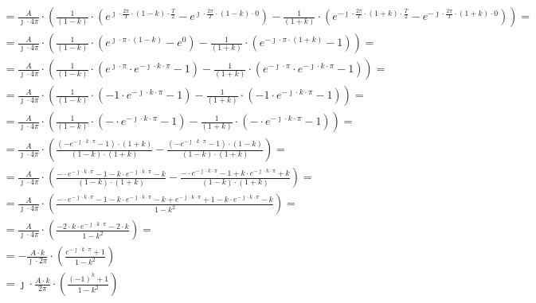 \begin{task}
\begin{align*}
&=\frac{A}{\jmath \cdot 4\pi} \cdot \left( \frac{1}{\left(1 -k\right)} \cdot \left(e^{\jmath \cdot \frac{2\pi}{T} \cdot \left(1 -k\right) \cdot \frac{T}{2}} -e^{\jmath \cdot \frac{2\pi}{T} \cdot \left(1 -k\right) \cdot 0}\right) - \frac{1}{ \left(1+k\right)}\cdot \left( e^{-\jmath \cdot \frac{2\pi}{T} \cdot \left(1+k\right)\cdot \frac{T}{2} } - e^{-\jmath \cdot \frac{2\pi}{T} \cdot \left(1+k\right)\cdot 0 }\right) \right)=\\
&=\frac{A}{\jmath \cdot 4\pi} \cdot \left( \frac{1}{\left(1 -k\right)} \cdot \left(e^{\jmath \cdot \pi \cdot \left(1 -k\right) } -e^{0}\right) - \frac{1}{ \left(1+k\right)}\cdot \left( e^{-\jmath \cdot \pi \cdot \left(1+k\right) } - 1\right) \right)=\\
&=\frac{A}{\jmath \cdot 4\pi} \cdot \left( \frac{1}{\left(1 -k\right)} \cdot \left(e^{\jmath \cdot \pi } \cdot e^{-\jmath \cdot k \cdot \pi}  -1\right) - \frac{1}{ \left(1+k\right)}\cdot \left( e^{-\jmath \cdot \pi } \cdot e^{-\jmath \cdot k \cdot \pi } - 1\right) \right)=\\
&=\frac{A}{\jmath \cdot 4\pi} \cdot \left( \frac{1}{\left(1 -k\right)} \cdot \left(-1 \cdot e^{-\jmath \cdot k \cdot \pi}  -1\right) - \frac{1}{ \left(1+k\right)}\cdot \left( -1 \cdot e^{-\jmath \cdot k \cdot \pi } - 1\right) \right)=\\
&=\frac{A}{\jmath \cdot 4\pi} \cdot \left( \frac{1}{\left(1 -k\right)} \cdot \left(- \cdot e^{-\jmath \cdot k \cdot \pi}  -1\right) - \frac{1}{ \left(1+k\right)}\cdot \left( - \cdot e^{-\jmath \cdot k \cdot \pi } - 1\right) \right)=\\
&=\frac{A}{\jmath \cdot 4\pi} \cdot \left( \frac{\left(- e^{-\jmath \cdot k \cdot \pi}  -1\right) \cdot \left(1+k\right) }{\left(1 -k\right) \cdot \left(1+k\right)} - \frac{\left( - e^{-\jmath \cdot k \cdot \pi } - 1\right)  \cdot \left(1 -k\right)}{\left(1 -k\right) \cdot \left(1+k\right)} \right)=\\
&=\frac{A}{\jmath \cdot 4\pi} \cdot \left( \frac{- \cdot e^{-\jmath \cdot k \cdot \pi}  -1 - k \cdot e^{-\jmath \cdot k \cdot \pi}  -k }{\left(1 -k\right) \cdot \left(1+k\right)} - \frac{ - \cdot e^{-\jmath \cdot k \cdot \pi } - 1 +k \cdot e^{-\jmath \cdot k \cdot \pi } +k }{\left(1 -k\right) \cdot \left(1+k\right)} \right)=\\
&=\frac{A}{\jmath \cdot 4\pi} \cdot \left( \frac{- \cdot e^{-\jmath \cdot k \cdot \pi}  -1 - k \cdot e^{-\jmath \cdot k \cdot \pi}  -k + e^{-\jmath \cdot k \cdot \pi } + 1 -k \cdot e^{-\jmath \cdot k \cdot \pi } -k }{1 -k^2} \right)=\\
&=\frac{A}{\jmath \cdot 4\pi} \cdot \left( \frac{ - 2\cdot k \cdot e^{-\jmath \cdot k \cdot \pi}  -2\cdot k}{1 -k^2} \right)=\\
&=-\frac{A \cdot k}{\jmath \cdot 2\pi} \cdot \left( \frac{ e^{-\jmath \cdot k \cdot \pi}  + 1}{1 -k^2} \right)\\
&=\jmath \cdot \frac{A \cdot k}{2\pi} \cdot \left( \frac{ (-1)^{k}  + 1}{1 -k^2} \right)
\end{align*}


\end{task}
